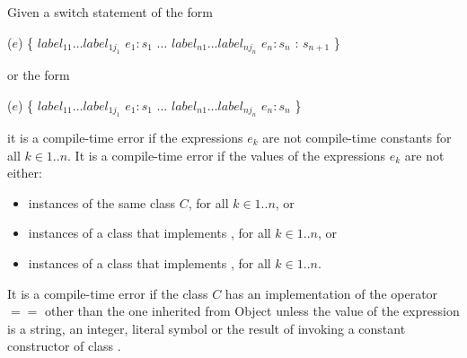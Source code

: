 \documentclass{article}
\newcommand{\code}[1]{{\sf #1}}
\begin{document}
\LMHash{}
 Given a switch statement of the form 
 
\begin{dartCode}
\SWITCH{} ($e$) \{ 
   \CASE{} $label_{11} \ldots label_{1j_1}$ $e_1: s_1$ 
   $\ldots$  
   \CASE{} $label_{n1} \ldots label_{nj_n}$ $e_n: s_n$ 
   \DEFAULT{}: $s_{n+1}$ 
\}
\end{dartCode}
 
 or the form 
 
\begin{dartCode}
\SWITCH{} ($e$) \{ 
   \CASE{} $label_{11} \ldots label_{1j_1}$ $e_1: s_1$
   $\ldots$  
   \CASE{} $label_{n1} \ldots label_{nj_n}$ $e_n: s_n$ 
\}
\end{dartCode}
 
 it is a compile-time error if the expressions $e_k$ are not compile-time constants for all  $k \in 1..n$.  It is a compile-time error if the values of the expressions $e_k$ are not either:
 \begin{itemize}
 \item instances of the same class $C$, for all $k \in 1..n$,  or 
 \item instances of a class that implements , for all $k \in 1..n$,  or 
 \item instances of a class that implements , for all $k \in 1..n$. 
 \end{itemize}
 

\LMHash{}
It is a compile-time error if the class $C$ has an implementation of the operator $==$ other than the one inherited from \code{Object} unless the value of the expression is a string, an integer, literal symbol or the result of invoking a constant constructor of class .
 

\end{document}
